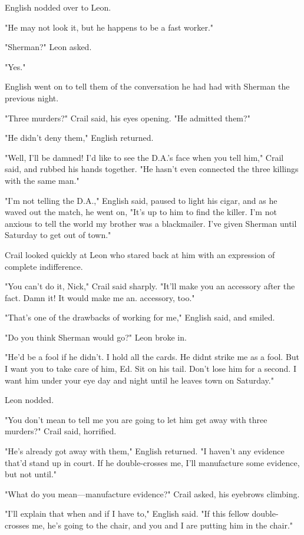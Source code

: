 \documentclass{novel}
\begin{document}
English nodded over to Leon.

"He may not look it, but he happens to be a fast worker."

"Sherman?" Leon asked.

"Yes."

English went on to tell them of the conversation he had had with Sherman the previous night.

"Three murders?" Crail said, his eyes opening. "He admitted them?"

"He didn't deny them," English returned.

"Well, I'll be damned! I'd like to see the D.A.'s face when you tell him," Crail said, and rubbed his hands together. "He hasn't even connected the three killings with the same man."

"I'm not telling the D.A.," English said, paused to light his cigar, and as he waved out the match, he went on, "It's up to him to find the killer. I'm not anxious to tell the world my brother was a blackmailer. I've given Sherman until Saturday to get out of town."

Crail looked quickly at Leon who stared back at him with an expression of complete indifference.

"You can't do it, Nick," Crail said sharply. "It'll make you an accessory after the fact. Damn it! It would make me an. accessory, too."

"That's one of the drawbacks of working for me," English said, and smiled.

"Do you think Sherman would go?" Leon broke in.

"He'd be a fool if he didn't. I hold all the cards. He didnt strike me as a fool. But I want you to take care of him, Ed. Sit on his tail. Don't lose him for a second. I want him under your eye day and night until he leaves town on Saturday."

Leon nodded.

"You don't mean to tell me you are going to let him get away with three murders?" Crail said, horrified.

"He's already got away with them," English returned. "I haven't any evidence that'd stand up in court. If he double-crosses me, I'll manufacture some evidence, but not until."

"What do you mean—manufacture evidence?" Crail asked, his eyebrows climbing.

"I'll explain that when and if I have to," English said. "If this fellow double-crosses me, he's going to the chair, and you and I are putting him in the chair."
\end{document}
